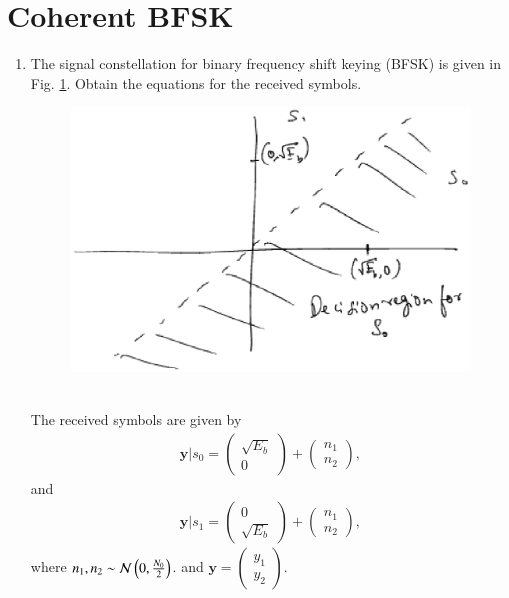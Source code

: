 \documentclass[journal,12pt,twocolumn]{IEEEtran}
\renewcommand\thesection{\arabic{section}}
\begin{document}
\section{Coherent BFSK}
\begin{enumerate}[label=\thesection.\arabic*.,ref=\thesection.\theenumi]

\item
The signal constellation for binary frequency shift keying (BFSK) is given in Fig. \ref{fig:bfsk_const}.
Obtain the equations for the received symbols.
\begin{figure}[!h]
\centering
\includegraphics[width=\columnwidth]{./figs/bfsk_const.eps}
\caption{}
\label{fig:bfsk_const}
\end{figure}
\\
\solution
The received symbols are given by
\begin{align}
\mathbf{y}|s_0 = 
\begin{pmatrix*}
\sqrt{E_b} \\
0
\end{pmatrix*}
+
\begin{pmatrix*}
 n_{1}\\
n_{2}
\end{pmatrix*},
\end{align}
and 
\begin{align}
\mathbf{y}|s_1 = 
\begin{pmatrix*}
0\\
\sqrt{E_b} 
\end{pmatrix*}
+
\begin{pmatrix*}
n_{1}\\
 n_{2}
\end{pmatrix*},
\end{align}
where $n_1,n_2 \sim \mathcal{N}\left(0,\frac{N_0}{2}\right)$. and
$
\mathbf{y} = 
\begin{pmatrix*}
y_{1}\\
 y_{2}
\end{pmatrix*}
$.


\end{enumerate}
\end{document}
